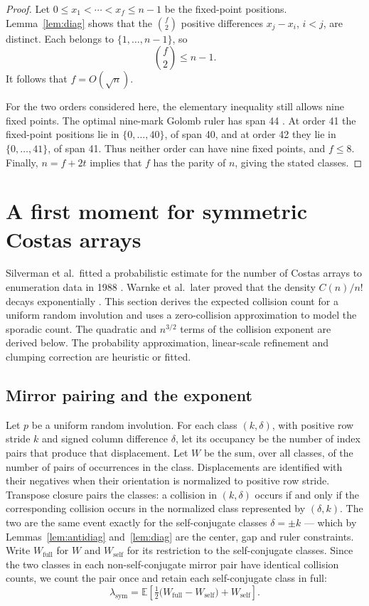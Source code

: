 \documentclass[11pt]{article}
\begin{document}
\begin{proof}
Let $0\leq x_1<\cdots<x_f\leq n-1$ be the fixed-point positions.
Lemma~\ref{lem:diag} shows that the $\binom{f}{2}$ positive differences
$x_j-x_i$, $i<j$, are distinct.  Each belongs to
$\{1,\ldots,n-1\}$, so
\[
\binom{f}{2}\leq n-1.
\]
It follows that $f=O(\sqrt n)$.

For the two orders considered here, the elementary inequality still
allows nine fixed points.  The optimal nine-mark Golomb ruler has span
44 \cite{Dimitromanolakis2002GolombRulers}.  At order 41
the fixed-point positions lie in $\{0,\ldots,40\}$, of span 40, and at
order 42 they lie in $\{0,\ldots,41\}$, of span 41.  Thus neither order
can have nine fixed points, and $f\leq8$.  Finally, $n=f+2t$ implies that
$f$ has the parity of $n$, giving the stated classes.
\end{proof}

\section{A first moment for symmetric Costas arrays}
\label{sec:model}

Silverman et al.\ fitted a probabilistic estimate for the number of Costas
arrays to enumeration data in 1988 \cite{SilvermanVickersMooney1988}.
Warnke et al.\ later proved that the density $C(n)/n!$ decays exponentially
\cite{WarnkeCorrellSwanson2023}.  This section derives the expected collision
count for a uniform random involution and uses a zero-collision approximation
to model the sporadic count.  The quadratic and $n^{3/2}$ terms of the
collision exponent are derived below.  The probability approximation,
linear-scale refinement and clumping correction are heuristic or fitted.

\subsection{Mirror pairing and the exponent}

Let $p$ be a uniform random involution.  For each class $(k,\delta)$, with
positive row stride $k$ and signed column difference $\delta$, let its
occupancy be the number of index pairs that produce that displacement.
Let $W$ be the sum, over all classes, of the number of pairs of
occurrences in the class.  Displacements are identified with their
negatives when their orientation is normalized to positive row stride.
Transpose closure pairs the classes: a collision in $(k,\delta)$ occurs
if and only if the corresponding collision occurs in the normalized
class represented by $(\delta,k)$.  The two are the same event exactly
for the self-conjugate classes $\delta=\pm k$ ---
which by Lemmas~\ref{lem:antidiag} and~\ref{lem:diag} are the center, gap
and ruler constraints.  Write $W_{\mathrm{full}}$ for $W$ and
$W_{\mathrm{self}}$ for its restriction to the self-conjugate classes.
Since the two classes in each non-self-conjugate mirror pair have identical
collision counts, we count the pair once and retain each self-conjugate class
in full:
\[
\lambda_{\mathrm{sym}}
= \mathbb{E}\!\left[\tfrac{1}{2}\bigl(W_{\mathrm{full}}-W_{\mathrm{self}}\bigr)
+ W_{\mathrm{self}}\right].
\]
\end{document}
